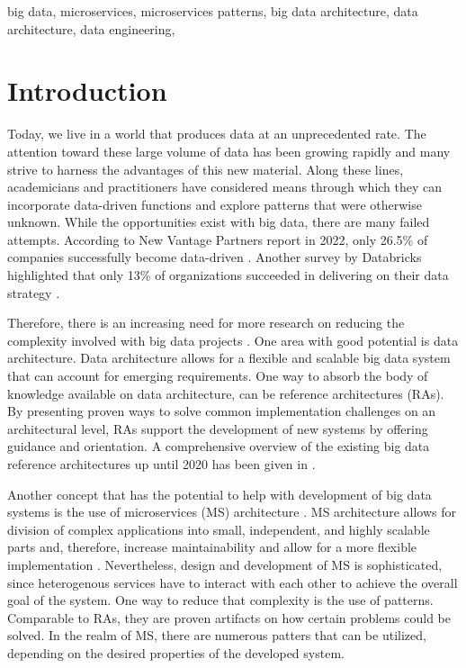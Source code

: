 \documentclass[conference]{IEEEtran}
\begin{document}
\begin{IEEEkeywords}
big data, microservices, microservices patterns, big data architecture, data architecture, data engineering, 
\end{IEEEkeywords}

\section{Introduction}


Today, we live in a world that produces data at an unprecedented rate. The attention toward these large volume of data has been growing rapidly and many strive to harness the advantages of this new material. Along these lines, academicians and practitioners have considered means through which they can incorporate data-driven functions and explore patterns that were otherwise unknown. While the opportunities exist with big data, there are many failed attempts. According to New Vantage Partners report in 2022, only 26.5\% of companies successfully become data-driven \cite{NewVantageSurvey}. Another survey by Databricks highlighted that only 13\% of organizations succeeded in delivering on their data strategy \cite{DataBricksSurvey}. 


Therefore, there is an increasing need for more research on reducing the complexity involved with big data projects \cite{Volk.2019}. One area with good potential is data architecture. Data architecture allows for a flexible and scalable big data system that can account for emerging requirements. One way to absorb the body of knowledge available on data architecture, can be reference architectures (RAs). By presenting proven ways to solve common implementation challenges on an architectural level, RAs support the development of new systems by offering guidance and orientation. A comprehensive overview of the existing big data reference architectures up until 2020 has been given in \cite{ataei2020big}. 





% 


Another concept that has the potential to help with development of big data systems is the use of microservices (MS) architecture \cite{Freymann.2020}. MS architecture allows for division of complex applications into small, independent, and highly scalable parts and, therefore, increase maintainability and allow for a more flexible implementation \cite{Nadareishvili.2016}. Nevertheless, design and development of MS is sophisticated, since heterogenous services have to interact with each other to achieve the overall goal of the system. One way to reduce that complexity is the use of patterns. Comparable to RAs, they are proven artifacts on how certain problems could be solved. In the realm of MS, there are numerous patters that can be utilized, depending on the desired properties of the developed system.
\end{document}
